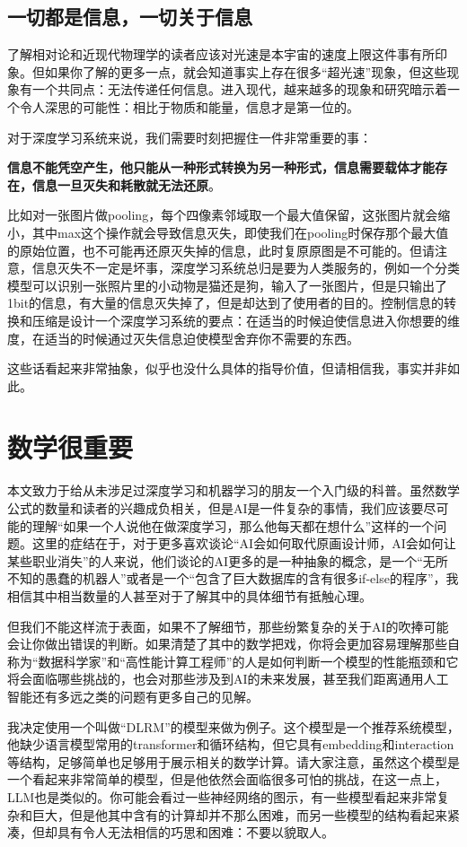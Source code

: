 \documentclass{article}
\begin{document}
\subsection{一切都是信息，一切关于信息}
了解相对论和近现代物理学的读者应该对光速是本宇宙的速度上限这件事有所印象。但如果你了解的更多一点，就会知道事实上存在很多“超光速”现象，但这些现象有一个共同点：无法传递任何信息。进入现代，越来越多的现象和研究暗示着一个令人深思的可能性：相比于物质和能量，信息才是第一位的。

对于深度学习系统来说，我们需要时刻把握住一件非常重要的事：

\textbf{信息不能凭空产生，他只能从一种形式转换为另一种形式，信息需要载体才能存在，信息一旦灭失和耗散就无法还原}。

比如对一张图片做pooling，每个四像素邻域取一个最大值保留，这张图片就会缩小，其中max这个操作就会导致信息灭失，即使我们在pooling时保存那个最大值的原始位置，也不可能再还原灭失掉的信息，此时复原原图是不可能的。但请注意，信息灭失不一定是坏事，深度学习系统总归是要为人类服务的，例如一个分类模型可以识别一张照片里的小动物是猫还是狗，输入了一张图片，但是只输出了1bit的信息，有大量的信息灭失掉了，但是却达到了使用者的目的。控制信息的转换和压缩是设计一个深度学习系统的要点：在适当的时候迫使信息进入你想要的维度，在适当的时候通过灭失信息迫使模型舍弃你不需要的东西。

这些话看起来非常抽象，似乎也没什么具体的指导价值，但请相信我，事实并非如此。

\section{数学很重要}
本文致力于给从未涉足过深度学习和机器学习的朋友一个入门级的科普。虽然数学公式的数量和读者的兴趣成负相关，但是AI是一件复杂的事情，我们应该要尽可能的理解“如果一个人说他在做深度学习，那么他每天都在想什么”这样的一个问题。这里的症结在于，对于更多喜欢谈论“AI会如何取代原画设计师，AI会如何让某些职业消失”的人来说，他们谈论的AI更多的是一种抽象的概念，是一个“无所不知的愚蠢的机器人”或者是一个“包含了巨大数据库的含有很多if-else的程序”，我相信其中相当数量的人甚至对于了解其中的具体细节有抵触心理。

但我们不能这样流于表面，如果不了解细节，那些纷繁复杂的关于AI的吹捧可能会让你做出错误的判断。如果清楚了其中的数学把戏，你将会更加容易理解那些自称为“数据科学家”和“高性能计算工程师”的人是如何判断一个模型的性能瓶颈和它将会面临哪些挑战的，也会对那些涉及到AI的未来发展，甚至我们距离通用人工智能还有多远之类的问题有更多自己的见解。

我决定使用一个叫做“DLRM”的模型来做为例子。这个模型是一个推荐系统模型，他缺少语言模型常用的transformer和循环结构，但它具有embedding和interaction等结构，足够简单也足够用于展示相关的数学计算。请大家注意，虽然这个模型是一个看起来非常简单的模型，但是他依然会面临很多可怕的挑战，在这一点上，LLM也是类似的。你可能会看过一些神经网络的图示，有一些模型看起来非常复杂和巨大，但是他其中含有的计算却并不那么困难，而另一些模型的结构看起来紧凑，但却具有令人无法相信的巧思和困难：不要以貌取人。
\end{document}
